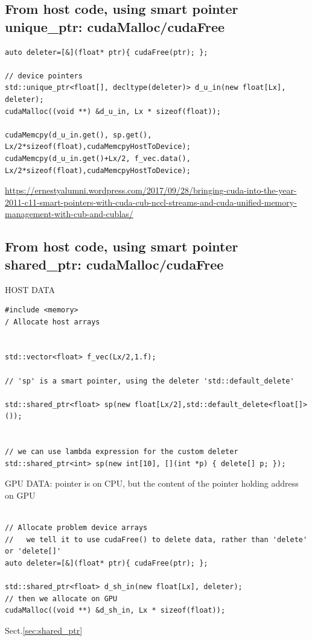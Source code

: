 \subsection{From host code, using smart pointer unique\_ptr: cudaMalloc/cudaFree}


\begin{lstlisting}
auto deleter=[&](float* ptr){ cudaFree(ptr); };

// device pointers
std::unique_ptr<float[], decltype(deleter)> d_u_in(new float[Lx], deleter);
cudaMalloc((void **) &d_u_in, Lx * sizeof(float));

cudaMemcpy(d_u_in.get(), sp.get(), Lx/2*sizeof(float),cudaMemcpyHostToDevice);
cudaMemcpy(d_u_in.get()+Lx/2, f_vec.data(), Lx/2*sizeof(float),cudaMemcpyHostToDevice);
\end{lstlisting}

\url{https://ernestyalumni.wordpress.com/2017/09/28/bringing-cuda-into-the-year-2011-c11-smart-pointers-with-cuda-cub-nccl-streams-and-cuda-unified-memory-management-with-cub-and-cublas/}

\subsection{From host code, using smart pointer shared\_ptr: cudaMalloc/cudaFree}

HOST DATA
\begin{lstlisting}
#include <memory>
/ Allocate host arrays


std::vector<float> f_vec(Lx/2,1.f);

// 'sp' is a smart pointer, using the deleter 'std::default_delete'

std::shared_ptr<float> sp(new float[Lx/2],std::default_delete<float[]>());


// we can use lambda expression for the custom deleter
std::shared_ptr<int> sp(new int[10], [](int *p) { delete[] p; });

\end{lstlisting}

GPU DATA: pointer is on CPU, but the content of the pointer holding address on GPU
\begin{lstlisting}

// Allocate problem device arrays
//   we tell it to use cudaFree() to delete data, rather than 'delete' or 'delete[]'
auto deleter=[&](float* ptr){ cudaFree(ptr); };

std::shared_ptr<float> d_sh_in(new float[Lx], deleter);
// then we allocate on GPU
cudaMalloc((void **) &d_sh_in, Lx * sizeof(float));

\end{lstlisting}
Sect.\ref{sec:shared_ptr}

